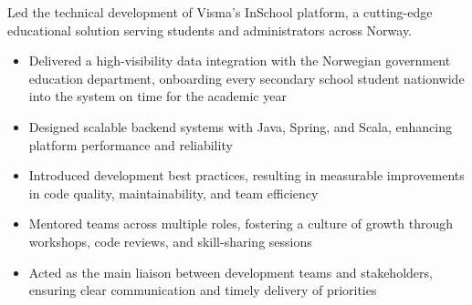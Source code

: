 \documentclass[9pt]{developercv} %
\newif\ifmanager
\begin{document}
\begin{entrylist}
{\begin{flushleft}
            \else
                Led the technical development of Visma's InSchool platform, a cutting-edge educational solution serving students and administrators across Norway.
            \fi
        \end{flushleft}
        \begin{itemize}[noitemsep,topsep=0pt,parsep=0pt,partopsep=0pt, leftmargin=15pt]
                \ifmanager
                    \item Managed direct reports and led team delivery of high-visibility data integration with Norwegian government education department, onboarding every secondary school student nationwide on time for the academic year
                    \item Built and mentored high-performing teams across multiple roles, fostering culture of growth through workshops, 1:1s, code reviews, and skill-sharing sessions
                    \item Established development best practices and engineering standards, resulting in measurable improvements in code quality, maintainability, and team efficiency
                    \item Served as main liaison between development teams and stakeholders, ensuring clear communication, expectation management, and timely delivery of priorities
                    \item Designed scalable backend systems with Java, Spring, and Scala, maintaining hands-on technical contribution alongside management responsibilities
                \else
                    \item Delivered a high-visibility data integration with the Norwegian government education department, onboarding every secondary school student nationwide into the system on time for the academic year
                    \item Designed scalable backend systems with Java, Spring, and Scala, enhancing platform performance and reliability
                    \item Introduced development best practices, resulting in measurable improvements in code quality, maintainability, and team efficiency
                    \item Mentored teams across multiple roles, fostering a culture of growth through workshops, code reviews, and skill-sharing sessions
                    \item Acted as the main liaison between development teams and stakeholders, ensuring clear communication and timely delivery of priorities
                \fi
        \end{itemize}

}
\end{entrylist}
\end{document}
